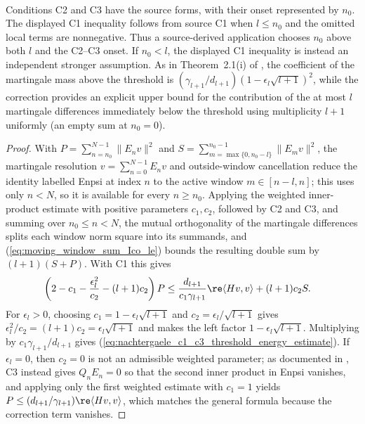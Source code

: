 \begin{lemma}
\begin{align}
    \end{align}
    Conditions C2 and C3 have the source forms, with their onset represented by
    $n_0$. The displayed C1 inequality follows from source C1 when
    $l\leq n_0$ and the omitted local terms are nonnegative. Thus a
    source-derived application chooses $n_0$ above both $l$ and the C2--C3
    onset. If $n_0<l$, the displayed C1 inequality is instead an independent
    stronger assumption. As in Theorem~2.1(i) of
    \cite{Nachtergaele1996Spectral}, the coefficient of the martingale mass
    above the threshold is $(\gamma_{l+1}/d_{l+1})(1-\epsilon_l\sqrt{l+1})^2$,
    while the correction provides an explicit upper bound
    for the contribution of the at most $l$ martingale differences immediately
    below the threshold using multiplicity $l+1$ uniformly (an empty sum at
    $n_0=0$).
\end{lemma}

\begin{proof}
    \leanok
    With $P=\sum_{n=n_0}^{N-1}\lVert E_nv\rVert^2$ and
    $S=\sum_{m=\max\{0,n_0-l\}}^{n_0-1}\lVert E_mv\rVert^2$, the martingale
    resolution $v=\sum_{n=0}^{N-1}E_nv$ and outside-window cancellation
    reduce the identity labelled \textup{Enpsi} at index $n$ to the active
    window $m\in[n-l,n]$; this uses only $n<N$, so it is available for every
    $n\geq n_0$. Applying the weighted inner-product estimate with positive
    parameters $c_1,c_2$, followed by C2 and C3, and summing over
    $n_0\leq n<N$, the mutual orthogonality of the
    martingale differences splits each window norm
    square into its summands, and
    (\ref{eq:moving_window_sum_Ico_le}) bounds the resulting double sum by
    $(l+1)(S+P)$. With C1 this gives
    \begin{align}
        \left(2-c_1-\frac{\epsilon_l^2}{c_2}-(l+1)c_2\right)P
         & \leq
        \frac{d_{l+1}}{c_1\gamma_{l+1}}\re\langle Hv,v\rangle
        +(l+1)c_2S.
    \end{align}
    For $\epsilon_l>0$, choosing $c_1=1-\epsilon_l\sqrt{l+1}$ and
    $c_2=\epsilon_l/\sqrt{l+1}$ gives
    $\epsilon_l^2/c_2=(l+1)c_2=\epsilon_l\sqrt{l+1}$ and makes the left factor
    $1-\epsilon_l\sqrt{l+1}$. Multiplying by
    $c_1\gamma_{l+1}/d_{l+1}$ gives
    (\ref{eq:nachtergaele_c1_c3_threshold_energy_estimate}). If
    $\epsilon_l=0$, then $c_2=0$ is not an admissible weighted parameter; as
    documented in \cite{gap:cpgsv21_martingale_overlap},
    C3 instead gives $Q_nE_n=0$ so that the second inner product in
    \textup{Enpsi} vanishes, and applying only the first weighted estimate with
    $c_1=1$ yields $P\leq(d_{l+1}/\gamma_{l+1})\re\langle Hv,v\rangle$,
    which matches the general formula because the correction term vanishes.
\end{proof}

